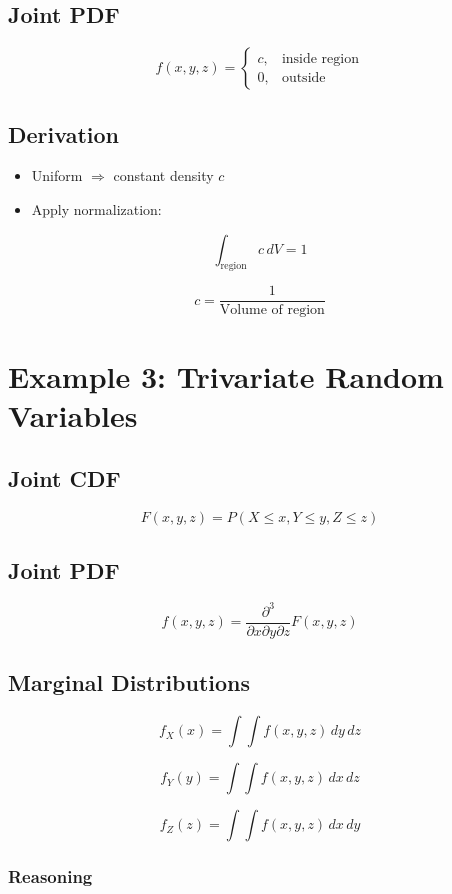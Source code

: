 \documentclass[12pt]{article}
\begin{document}
\subsection{Joint PDF}

\[
f(x,y,z) =
\begin{cases}
c, & \text{inside region} \\
0, & \text{outside}
\end{cases}
\]

\subsection{Derivation}

\begin{itemize}
\item Uniform $\Rightarrow$ constant density $c$
\item Apply normalization:
\end{itemize}

\[
\int_{\text{region}} c\, dV = 1
\]

\[
c = \frac{1}{\text{Volume of region}}
\]

\section{Example 3: Trivariate Random Variables}

\subsection{Joint CDF}

\[
F(x,y,z) = P(X \le x, Y \le y, Z \le z)
\]

\subsection{Joint PDF}

\[
f(x,y,z) =
\frac{\partial^3}{\partial x \partial y \partial z}
F(x,y,z)
\]

\subsection{Marginal Distributions}

\[
f_X(x) = \int \int f(x,y,z)\, dy\, dz
\]

\[
f_Y(y) = \int \int f(x,y,z)\, dx\, dz
\]

\[
f_Z(z) = \int \int f(x,y,z)\, dx\, dy
\]

\subsubsection*{Reasoning}
\end{document}
